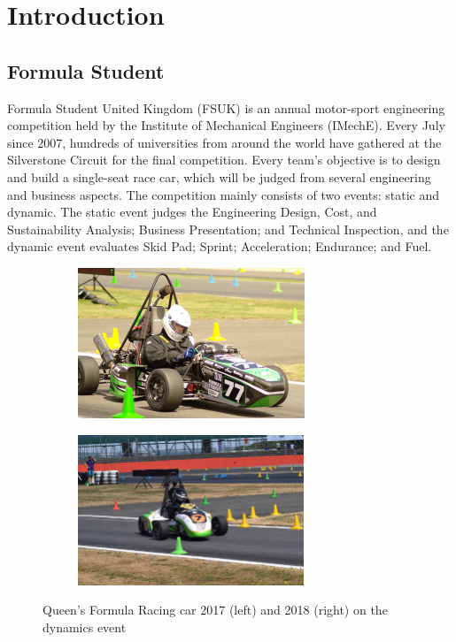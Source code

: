 \newpage
\setcounter{page}{1}
\justifying
\noindent

\section{Introduction}
\subsection{Formula Student}
Formula Student United Kingdom (FSUK) is an annual motor-sport engineering competition held by the Institute of Mechanical Engineers (IMechE). Every July since 2007, hundreds of universities from around the world have gathered at the Silverstone Circuit for the final competition. Every team's objective is to design and build a single-seat race car, which will be judged from several engineering and business aspects. The competition mainly consists of two events: static and dynamic. The static event judges the Engineering  Design,  Cost, and  Sustainability  Analysis; Business Presentation; and Technical Inspection, and the dynamic event evaluates Skid Pad; Sprint; Acceleration; Endurance; and Fuel.

\begin{figure}[!ht]
\begin{center}
%    
  \begin{subfigure}[b]{0.45\textwidth}
    \includegraphics[height=4.5cm]{Figures/QFR17PHOTO.JPG}
  \end{subfigure}
  \begin{subfigure}[b]{0.45\textwidth}
    \includegraphics[height=4.5cm]{Figures/QFR18PHOTO.jpg}
  \end{subfigure}
%  
  \caption{Queen's Formula Racing car 2017 (left) and 2018 (right) on the dynamics event}
    \label{fig:1}
\end{center}
\end{figure}

